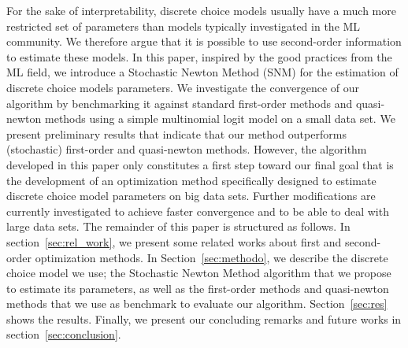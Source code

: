 \documentclass[conference]{IEEEtran}
\begin{document}
For the sake of interpretability, discrete choice models usually have a much more restricted set of parameters than models typically investigated in the ML community. We therefore argue that it is possible to use second-order information to estimate these models. In this paper, inspired by the good practices from the ML field, we introduce a Stochastic Newton Method (SNM) for the estimation of discrete choice models parameters. We investigate the convergence of our algorithm by benchmarking it against standard first-order methods and quasi-newton methods using a simple multinomial logit model on a small data set. We present preliminary results that indicate that our method outperforms (stochastic) first-order and quasi-newton methods. However, the algorithm developed in this paper only constitutes a first step toward our final goal that is the development of an optimization method specifically designed to estimate discrete choice model parameters on big data sets. Further modifications are currently investigated to achieve faster convergence and to be able to deal with large data sets.
The remainder of this paper is structured as follows. In section~\ref{sec:rel_work}, we present some related works about first and second-order optimization methods. In Section~\ref{sec:methodo}, we describe the discrete choice model we use; the Stochastic Newton Method algorithm that we propose to estimate its parameters, as well as the first-order methods and quasi-newton methods that we use as benchmark to evaluate our algorithm. Section~\ref{sec:res} shows the results. Finally, we present our concluding remarks and future works in section~\ref{sec:conclusion}. 


\end{document}
